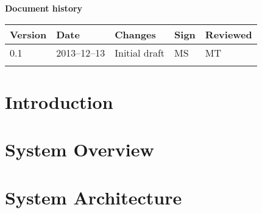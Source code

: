 \documentclass[10pt, a4paper, twoside]{article}
\numberwithin{equation}{subsection}
\numberwithin{figure}{section}
\numberwithin{table}{section}
\begin{document}



\newpage
\pagestyle{fancy}
\setcounter{page}{2} %




\newpage
\tableofcontents
\listoffigures
\listoftables



\newpage
\vspace*{5\baselineskip}

\begin{center}
\textbf{\LARGE Document history}

{ \footnotesize 
\begin{tabular}{|p{1cm}|p{2.0cm}|p{5cm}|p{1.5cm}|p{2cm}|}
	\hline

	\textbf{Version} & \textbf{Date} & \textbf{Changes} & \textbf{Sign} & \textbf{Reviewed} \\
	
	\hline
	0.1 & 2013--12--13 & Initial draft & MS & MT\\
	
	\hline
	 &  &  &  &  \\
	
	\hline
\end{tabular}
}
\end{center}





%
%
\newpage
{}

\newpage
\section{Introduction}
\label{sec:introduction}


\newpage
\section{System Overview}
\label{sec:system_overview}


\newpage
\section{System Architecture}
\label{sec:system_architecture}

\end{document}
